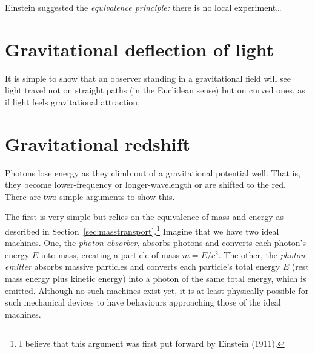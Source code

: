 Einstein suggested the {\em equivalence principle:\/} there is no
local experiment\ldots


\section{Gravitational deflection of light}

It is simple to show that an observer standing in a gravitational
field will see light travel not on straight paths (in the Euclidean
sense) but on curved ones, as if light feels gravitational attraction.


\section{Gravitational redshift}

Photons lose energy as they climb out of a gravitational potential
well.  That is, they become lower-frequency or longer-wavelength or
are shifted to the red.  There are two simple arguments to show this.

The first is very simple but relies on the equivalence of mass and
energy as described in Section~\ref{sec:masstransport}.\footnote{I
believe that this argument was first put forward by Einstein (1911).}
Imagine that we have two ideal machines.  One, the {\em photon
absorber,\/} absorbs photons and converts each photon's energy $E$
into mass, creating a particle of mass $m=E/c^2$.  The other, the {\em
photon emitter\/} absorbs massive particles and converts each
particle's total energy $E$ (rest mass energy plus kinetic energy)
into a photon of the same total energy, which is emitted.  Although no
such machines exist yet, it is at least physically possible for such
mechanical devices to have behaviours approaching those of the ideal
machines.

